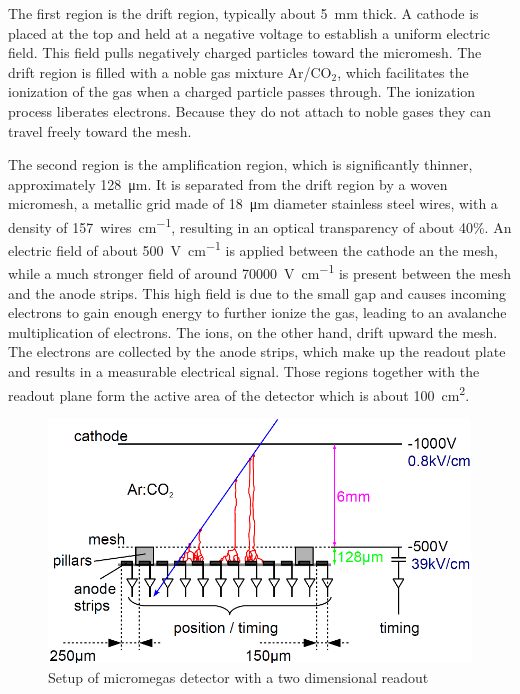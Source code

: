\documentclass[sn-mathphys-num,iicol]{sn-jnl}
\theoremstyle{thmstyleone}
\theoremstyle{thmstyletwo}
\theoremstyle{thmstylethree}
\begin{document}
The first region is the drift region, typically about \SI{5}{\milli\meter} thick.
A cathode is placed at the top and held at a negative voltage to establish a uniform electric field.
This field pulls negatively charged particles toward the micromesh. 
The drift region is filled with a noble gas mixture Ar/CO$_2$, which facilitates the ionization of the gas when a charged particle passes through. 
The ionization process liberates electrons. 
Because they do not attach to noble gases they can travel freely toward the mesh. 

The second region is the amplification region, which is significantly thinner, approximately \SI{128}{\micro\meter}. 
It is separated from the drift region by a woven micromesh, a metallic grid made of \SI{18}{\micro\meter} diameter stainless steel wires, with a density of \SI{157}{wires\per\cm}, resulting in an optical transparency of about 40\%.
An electric field of about \SI{500}{\volt\per\centi\meter} is applied between the cathode an the mesh, while a much stronger field of around \SI{70000}{\volt\per\centi\meter} is present between the mesh and the anode strips. 
This high field is due to the small gap and causes incoming electrons to gain enough energy to further ionize the gas, leading to an avalanche multiplication of electrons. 
The ions, on the other hand, drift upward the mesh. 
The electrons are collected by the anode strips, which make up the readout plate and results in a measurable electrical signal. 
Those regions together with the readout plane form the active area of the detector which is about \SI{100}{\centi\meter^2}.
\begin{figure}
  \includegraphics[width=\linewidth]{figures/detector_readout.png}
  \caption{Setup of micromegas detector with a two dimensional readout \cite{Micromegas}}
  \label{fig:readout}
\end{figure}
\end{document}
